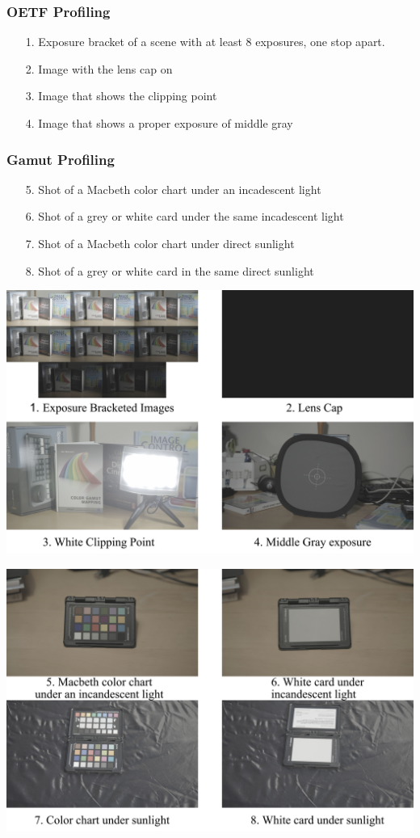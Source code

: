 \documentclass[twoside]{article}
\begin{document}
\subsubsection*{OETF Profiling}
\begin{enumerate}
    \item[1.] Exposure bracket of a scene with at least 8 exposures, one stop apart.
    \item[2.] Image with the lens cap on
    \item[3.] Image that shows the clipping point
    \item[4.] Image that shows a proper exposure of middle gray
\end{enumerate}

\subsubsection*{Gamut Profiling}
\begin{enumerate}
    \item[5.] Shot of a Macbeth color chart under an incadescent light
    \item[6.] Shot of a grey or white card under the same incadescent light
    \item[7.] Shot of a Macbeth color chart under direct sunlight
    \item[8.] Shot of a grey or white card in the same direct sunlight
\end{enumerate}

\newpage
\includegraphics[scale=0.35]{images/OETF Images.jpg}

\includegraphics[scale=0.35]{images/Gamut Images.jpg}
\end{document}
